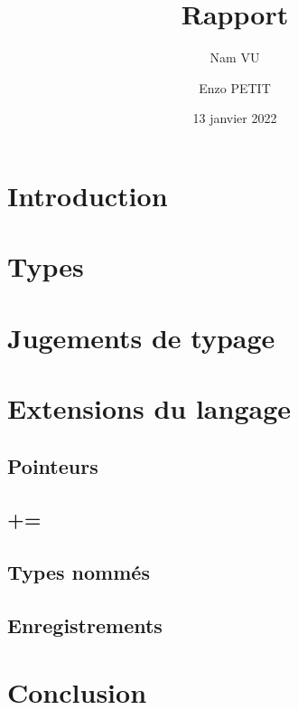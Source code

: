 \documentclass[headings=standardclasses,parskip=half]{scrartcl}
\title{Rapport}
\subtitle{}
\author{Nam VU \and Enzo PETIT}
\date{13 janvier 2022}
\begin{document}
\maketitle

\tableofcontents

\pagebreak

\section{Introduction}

\section{Types}

\section{Jugements de typage}

\section{Extensions du langage}

\subsection{Pointeurs}

\subsection{+=}

\subsection{Types nommés}

\subsection{Enregistrements}

\section{Conclusion}
\end{document}
